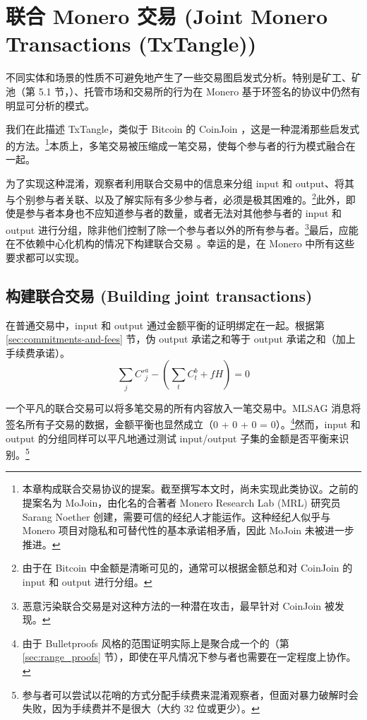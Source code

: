 \chapter{联合 Monero 交易 (Joint Monero Transactions (TxTangle))}
\label{chapter:txtangle}

不同实体和场景的性质不可避免地产生了一些交易图启发式分析。特别是矿工、矿池（第 5.1 节，\cite{AnalysisOfLinkability}）、托管市场和交易所的行为在 Monero 基于环签名的协议中仍然有明显可分析的模式。

我们在此描述 TxTangle，类似于 Bitcoin 的 CoinJoin \cite{coinjoin-wiki}，这是一种混淆那些启发式的方法。\footnote{本章构成联合交易协议的提案。截至撰写本文时，尚未实现此类协议。之前的提案名为 MoJoin，由化名的合著者 Monero Research Lab (MRL) 研究员 Sarang Noether 创建，需要可信的经纪人才能运作。这种经纪人似乎与 Monero 项目对隐私和可替代性的基本承诺相矛盾，因此 MoJoin 未被进一步推进。}本质上，多笔交易被压缩成一笔交易，使每个参与者的行为模式融合在一起。

为了实现这种混淆，观察者利用联合交易中的信息来分组 input 和 output、将其与个别参与者关联、以及了解实际有多少参与者，必须是极其困难的。\footnote{由于在 Bitcoin 中金额是清晰可见的，通常可以根据金额总和对 CoinJoin 的 input 和 output 进行分组。\cite{coinjoin-sudoku}}此外，即使是参与者本身也不应知道参与者的数量，或者无法对其他参与者的 input 和 output 进行分组，除非他们控制了除一个参与者以外的所有参与者。\footnote{恶意污染联合交易是对这种方法的一种潜在攻击，最早针对 CoinJoin 被发现。\cite{coinjoin-pollution}}最后，应能在不依赖中心化机构的情况下构建联合交易 \cite{exa-blockchain-analysis}。幸运的是，在 Monero 中所有这些要求都可以实现。



\section{构建联合交易 (Building joint transactions)}
\label{sec:building-txtangle}

在普通交易中，input 和 output 通过金额平衡的证明绑定在一起。根据第 \ref{sec:commitments-and-fees} 节，伪 output 承诺之和等于 output 承诺之和（加上手续费承诺）。
\[\sum_j C'^a_{j} - (\sum_t C^b_{t} + f H) = 0\]

一个平凡的联合交易可以将多笔交易的所有内容放入一笔交易中。MLSAG 消息将签名所有子交易的数据，金额平衡也显然成立（0 + 0 + 0 = 0）。\footnote{由于 Bulletproofs 风格的范围证明实际上是聚合成一个的（第 \ref{sec:range_proofs} 节），即使在平凡情况下参与者也需要在一定程度上协作。}然而，input 和 output 的分组同样可以平凡地通过测试 input/output 子集的金额是否平衡来识别。\footnote{参与者可以尝试以花哨的方式分配手续费来混淆观察者，但面对暴力破解时会失败，因为手续费并不是很大（大约 32 位或更少）。}


